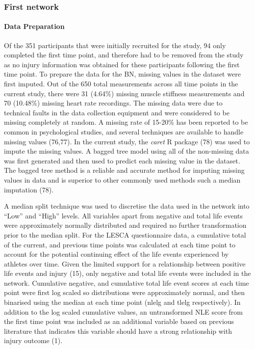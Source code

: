 \documentclass[
  english,
  man]{apa6}
\let\oldparagraph\paragraph
\renewcommand{\paragraph}[1]{\oldparagraph{#1}\mbox{}}
\begin{document}
\hypertarget{first-network}{%
\subsubsection{First network}\label{first-network}}

\hypertarget{data-preparation}{%
\paragraph{Data Preparation}\label{data-preparation}}

Of the 351 participants that were initially recruited for the study, 94 only completed the first time point, and therefore had to be removed from the study as no injury information was obtained for these participants following the first time point.
To prepare the data for the BN, missing values in the dataset were first imputed.
Out of the 650 total measurements across all time points in the current study, there were 31 (4.64\%) missing muscle stiffness measurements and 70 (10.48\%) missing heart rate recordings. The missing data were due to technical faults in the data collection equipment and were considered to be missing completely at random.
A missing rate of 15-20\% has been reported to be common in psychological studies, and several techniques are available to handle missing values (76,77).
In the current study, the \emph{caret} R package (78) was used to impute the missing values.
A bagged tree model using all of the non-missing data was first generated and then used to predict each missing value in the dataset.
The bagged tree method is a reliable and accurate method for imputing missing values in data and is superior to other commonly used methods such a median imputation (78).

A median split technique was used to discretise the data used in the network into ``Low'' and ``High'' levels.
All variables apart from negative and total life events were approximately normally distributed and required no further transformation prior to the median split.
For the LESCA questionnaire data, a cumulative total of the current, and previous time points was calculated at each time point to account for the potential continuing effect of the life events experienced by athletes over time.
Given the limited support for a relationship between positive life events and injury (15), only negative and total life events were included in the network.
Cumulative negative, and cumulative total life event scores at each time point were first log scaled so distributions were approximately normal, and then binarised using the median at each time point (nlelg and tlelg respectively).
In addition to the log scaled cumulative values, an untransformed NLE score from the first time point was included as an additional variable based on previous literature that indicates this variable should have a strong relationship with injury outcome (1).
\end{document}
